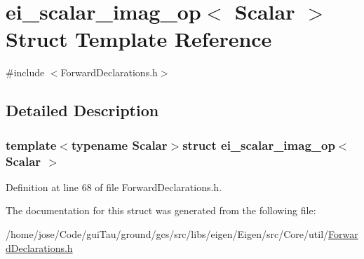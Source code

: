 \hypertarget{structei__scalar__imag__op}{\section{ei\-\_\-scalar\-\_\-imag\-\_\-op$<$ Scalar $>$ Struct Template Reference}
\label{structei__scalar__imag__op}
}


{\ttfamily \#include $<$Forward\-Declarations.\-h$>$}



\subsection{Detailed Description}
\subsubsection*{template$<$typename Scalar$>$struct ei\-\_\-scalar\-\_\-imag\-\_\-op$<$ Scalar $>$}



Definition at line 68 of file Forward\-Declarations.\-h.



The documentation for this struct was generated from the following file\-:\begin{DoxyCompactItemize}
\item 
/home/jose/\-Code/gui\-Tau/ground/gcs/src/libs/eigen/\-Eigen/src/\-Core/util/\hyperlink{_forward_declarations_8h}{Forward\-Declarations.\-h}\end{DoxyCompactItemize}
